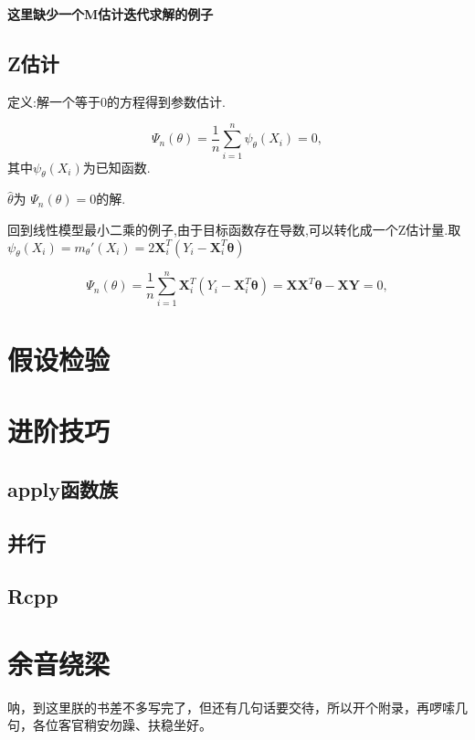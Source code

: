 \documentclass[]{ctexbook}
\begin{document}
\textbf{这里缺少一个M估计迭代求解的例子}

\hypertarget{z}{%
\section{Z估计}\label{z}}

定义:解一个等于0的方程得到参数估计.

\[
\Psi_{n}(\theta)=\frac{1}{n} \sum_{i=1}^{n} \psi_{\theta}\left(X_{i}\right)=0,
\]
其中\(\psi_{\theta}\left(X_{i}\right)\)为已知函数.

\(\hat{\theta}\)为
\(\Psi_{n}(\theta)=0\)的解.

回到线性模型最小二乘的例子,由于目标函数存在导数,可以转化成一个Z估计量.取
\(\psi_{\theta}\left(X_{i}\right)=m_{\theta}'\left(X_{i}\right)=2\boldsymbol{X}_{i}^{T} \left(Y_{i}-\boldsymbol{X}_{i}^{T} \boldsymbol{\theta}\right)\)

\[
\Psi_{n}(\theta)=\frac{1}{n} \sum_{i=1}^{n}\boldsymbol{X}_{i}^{T}  \left(Y_{i}-\boldsymbol{X}_{i}^{T} \boldsymbol{\theta}\right) =\boldsymbol{X} \boldsymbol{X}^{T} \boldsymbol{\theta}-\boldsymbol{X} \boldsymbol{Y}=0,
\]

\hypertarget{section-10}{%
\chapter{假设检验}\label{section-10}}

\hypertarget{section-11}{%
\chapter{进阶技巧}\label{section-11}}

\hypertarget{apply}{%
\section{apply函数族}\label{apply}}

\hypertarget{section-12}{%
\section{并行}\label{section-12}}

\hypertarget{rcpp}{%
\section{Rcpp}\label{rcpp}}

\cleardoublepage

\hypertarget{appendix-}{%
\appendix {}}


\hypertarget{sound}{%
\chapter{余音绕梁}\label{sound}}

呐，到这里朕的书差不多写完了，但还有几句话要交待，所以开个附录，再啰嗦几句，各位客官稍安勿躁、扶稳坐好。



\backmatter
\printindex
\end{document}
